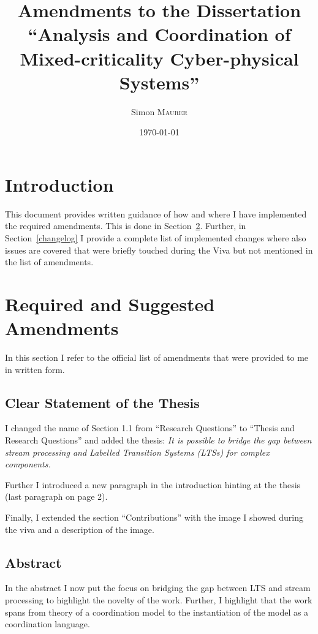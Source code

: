 \documentclass{article}
\title{Amendments to the Dissertation\\``Analysis and Coordination of Mixed-criticality Cyber-physical Systems''} %
\author{Simon \textsc{Maurer}} %
\date{\today} %
\begin{document}
\maketitle %



\section{Introduction}

This document provides written guidance of how and where I have implemented the required amendments.
This is done in Section~\ref{amendments}.
Further, in Section~\ref{changelog} I provide a complete list of implemented changes where also issues are covered that were briefly touched during the Viva but not mentioned in the list of amendments.

\section{Required and Suggested Amendments}
\label{amendments}
In this section I refer to the official list of amendments that were provided to me in written form.

\subsection{Clear Statement of the Thesis}
I changed the name of Section 1.1 from ``Research Questions'' to ``Thesis and Research Questions'' and added the thesis:
\emph{It is possible to bridge the gap between stream processing and Labelled Transition Systems (LTSs) for complex components.}

Further I introduced a new paragraph in the introduction hinting at the thesis (last paragraph on page 2).

Finally, I extended the section ``Contributions'' with the image I showed during the viva and a description of the image.

\subsection{Abstract}
In the abstract I now put the focus on bridging the gap between LTS and stream processing to highlight the novelty of the work.
Further, I highlight that the work spans from theory of a coordination model to the instantiation of the model as a coordination language.
\end{document}
